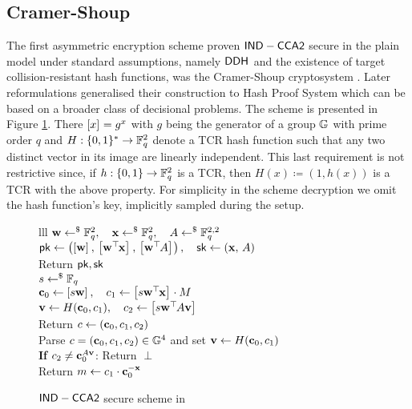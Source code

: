 
\subsection{Cramer-Shoup}

The first asymmetric encryption scheme proven $\mathsf{IND-CCA2}$ secure in the plain model under standard assumptions, namely $\mathsf{DDH}^{}$ and the existence of target collision-resistant hash functions, was the Cramer-Shoup cryptosystem \cite{C:CraSho98}. Later reformulations generalised their construction to Hash Proof System \cite{EC:CraSho02} which can be based on a broader class of decisional problems.
The scheme is presented in Figure \ref{prot:CraSho98}. There $\left[{x}\right]_{} = g^x$ with $g$ being the generator of a group $\mathbb{G}$ with prime order $q$ and $H : \{0,1\}^\ast \to \mathbb{F}_q^2$ denote a TCR  hash function such that any two distinct vector in its image are linearly independent.
This last requirement is not restrictive since, if $h : \{0, 1\} \to \mathbb{F}_q^2$ is a TCR, then $H(x) \coloneqq (1, h(x))$ is a TCR with the above property.
For simplicity in the scheme decryption we omit the hash function's key, implicitly sampled during the setup.

\begin{figure}[htb]
\centering
\begin{pcarray}{lll}
	{
		$\mathbf{w} \gets^{\$} \mathbb{F}_q^2, \quad \mathbf{x} \gets^{\$} \mathbb{F}_q^2, \quad A \gets^{\$} \mathbb{F}_q^{2,2}$
			\\
		$
			\mathsf{pk} \gets \left(
				\left[{\mathbf{w}}\right]_{}
					, \,
				\left[{\mathbf{w}^\top\hspace{-.1em} \mathbf{x}}\right]_{}
					, \,
				\left[{\mathbf{w}^\top\hspace{-.1em} A}\right]_{}
				\right), \quad
			\mathsf{sk} \gets
				(\mathbf{x}, \, A)
		$
			\\
		Return $\mathsf{pk}, \mathsf{sk}$
	}
	\\
	{
		$s \gets^{\$} \mathbb{F}_q$
			\\
		\label{step:CraSho98:enc:first_part}
		$\mathbf{c}_0 \gets \left[{s \mathbf{w}}\right]_{}
			, \quad
		c_1 \gets \left[{s \mathbf{w}^\top\hspace{-.1em} \mathbf{x}}\right]_{} \cdot M$
			\\
		\label{step:CraSho98:enc:second_part}
		$\mathbf{v} \gets H(\mathbf{c}_0, c_1), \quad c_2 \gets \left[{s \mathbf{w}^\top\hspace{-.1em} A \mathbf{v}}\right]_{}$
			\\
		Return $c \gets (\mathbf{c}_0, c_1, c_2)$
	}
	\\
	{
		Parse $c = (\mathbf{c}_0, c_1, c_2) \in \mathbb{G}^4$ and set $\mathbf{v} \gets H(\mathbf{c}_0, c_1)$
			\\
		\label{step:CraSho98:dec:test}
		\textbf{If} $c_2 \neq \mathbf{c}_0^{A \mathbf{v}}$: Return $\perp$
			\\
		\label{step:CraSho98:dec:decrypytion_step}
		Return $m \gets c_1 \cdot \mathbf{c}_0^{-\mathbf{x}}$	
	}
\end{pcarray}
\caption{$\mathsf{IND-CCA2}$ secure scheme in \cite{C:CraSho98}}
\label{prot:CraSho98}
\end{figure}

